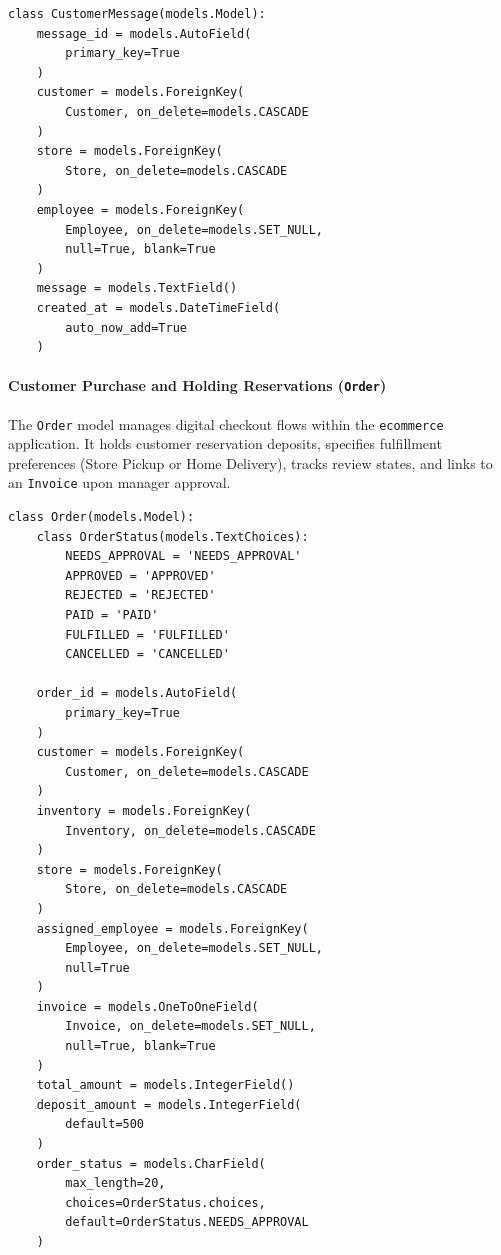 \begin{tcolorbox}[title=\textbf{Listing 5.6: Store Inquiry Model (\texttt{CustomerMessage})}, colback=gray!4, colframe=indigo!70!black, arc=2pt, boxrule=0.6pt, left=6pt, right=6pt, top=4pt, bottom=4pt]
\footnotesize
\begin{verbatim}
class CustomerMessage(models.Model):
    message_id = models.AutoField(
        primary_key=True
    )
    customer = models.ForeignKey(
        Customer, on_delete=models.CASCADE
    )
    store = models.ForeignKey(
        Store, on_delete=models.CASCADE
    )
    employee = models.ForeignKey(
        Employee, on_delete=models.SET_NULL,
        null=True, blank=True
    )
    message = models.TextField()
    created_at = models.DateTimeField(
        auto_now_add=True
    )
\end{verbatim}
\end{tcolorbox}

\paragraph{Customer Purchase and Holding Reservations (\texttt{Order})}
The \texttt{Order} model manages digital checkout flows within the \texttt{ecommerce} application. It holds customer reservation deposits, specifies fulfillment preferences (Store Pickup or Home Delivery), tracks review states, and links to an \texttt{Invoice} upon manager approval.

\begin{tcolorbox}[title=\textbf{Listing 5.7: Customer Order Model (\texttt{Order})}, colback=gray!4, colframe=indigo!70!black, arc=2pt, boxrule=0.6pt, left=6pt, right=6pt, top=4pt, bottom=4pt]
\footnotesize
\begin{verbatim}
class Order(models.Model):
    class OrderStatus(models.TextChoices):
        NEEDS_APPROVAL = 'NEEDS_APPROVAL'
        APPROVED = 'APPROVED'
        REJECTED = 'REJECTED'
        PAID = 'PAID'
        FULFILLED = 'FULFILLED'
        CANCELLED = 'CANCELLED'

    order_id = models.AutoField(
        primary_key=True
    )
    customer = models.ForeignKey(
        Customer, on_delete=models.CASCADE
    )
    inventory = models.ForeignKey(
        Inventory, on_delete=models.CASCADE
    )
    store = models.ForeignKey(
        Store, on_delete=models.CASCADE
    )
    assigned_employee = models.ForeignKey(
        Employee, on_delete=models.SET_NULL,
        null=True
    )
    invoice = models.OneToOneField(
        Invoice, on_delete=models.SET_NULL,
        null=True, blank=True
    )
    total_amount = models.IntegerField()
    deposit_amount = models.IntegerField(
        default=500
    )
    order_status = models.CharField(
        max_length=20,
        choices=OrderStatus.choices,
        default=OrderStatus.NEEDS_APPROVAL
    )
\end{verbatim}
\end{tcolorbox}


